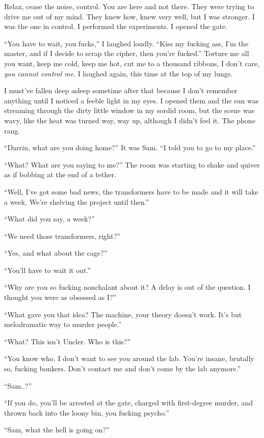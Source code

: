 \documentclass[
]{article}
\begin{document}
Relax, cease the noise, control. You are here and not there. They were
trying to drive me out of my mind. They knew how, knew very well, but I
was stronger. I was the one in control. I performed the experiments. I
opened the gate.

``You have to wait, you fucks,'' I laughed loudly. ``Kiss my fucking
ass, I'm the master, and if I decide to scrap the cipher, then you're
fucked.'' Torture me all you want, keep me cold, keep me hot, cut me to
a thousand ribbons, I don't care, \emph{you cannot control me}. I
laughed again, this time at the top of my lungs.

I must've fallen deep asleep sometime after that because I don't
remember anything until I noticed a feeble light in my eyes. I opened
them and the sun was streaming through the dirty little window in my
sordid room, but the scene was wavy, like the heat was turned way, way
up, although I didn't feel it. The phone rang.

``Darrin, what are you doing home?'' It was Sam. ``I told you to go to
my place.''

``What? What are you saying to me?'' The room was starting to shake and
quiver as if bobbing at the end of a tether.

``Well, I've got some bad news, the transformers have to be made and it
will take a week. We're shelving the project until then.''

``What did you say, a week?''

``We need those transformers, right?''

``Yes, and what about the cage?''

``You'll have to wait it out.''

``Why are you so fucking nonchalant about it? A delay is out of the
question. I thought you were as obsessed as I?''

``What gave you that idea? The machine, your theory doesn't work. It's
but melodramatic way to murder people.''

``What? This isn't Uncler. Who is this?''

``You know who. I don't want to see you around the lab. You're insane,
brutally so, fucking bonkers. Don't contact me and don't come by the lab
anymore.''

``Sam..?''

``If you do, you'll be arrested at the gate, charged with first-degree
murder, and thrown back into the loony bin, you fucking psycho.''

``Sam, what the hell is going on?''
\end{document}

